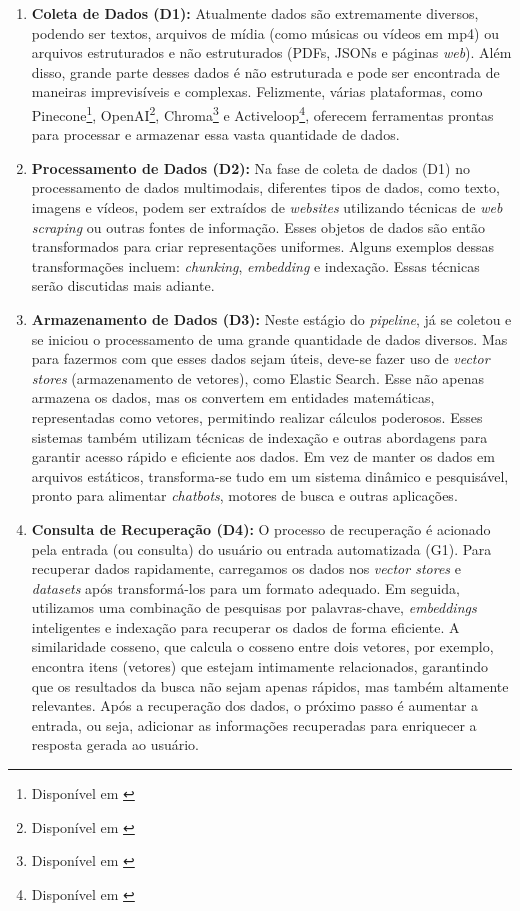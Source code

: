 \documentclass[a4paper, 12pt]{article}
\newcommand{\citeb}[1]{\bibleftbracket\cite{#1}\bibrightbracket}
\begin{document}
    \begin{enumerate}
        \item \textbf{Coleta de Dados (D1):} Atualmente dados são extremamente diversos, podendo ser textos, arquivos de mídia (como músicas ou vídeos em mp4) ou arquivos estruturados e não estruturados (PDFs, JSONs e páginas \textit{web}). Além disso, grande parte desses dados é não estruturada e pode ser encontrada de maneiras imprevisíveis e complexas. Felizmente, várias plataformas, como Pinecone\footnote{Disponível em \citeb{pinecone}}, OpenAI\footnote{Disponível em \citeb{openai}}, Chroma\footnote{Disponível em \citeb{chroma}} e Activeloop\footnote{Disponível em \citeb{activeloop}}, oferecem ferramentas prontas para processar e armazenar essa vasta quantidade de dados.
        \item \textbf{Processamento de Dados (D2):} Na fase de coleta de dados (D1) no processamento de dados multimodais, diferentes tipos de dados, como texto, imagens e vídeos, podem ser extraídos de \textit{websites} utilizando técnicas de \textit{web scraping} ou outras fontes de informação. Esses objetos de dados são então transformados para criar representações uniformes. Alguns exemplos dessas transformações incluem: \textit{chunking}, \textit{embedding} e indexação. Essas técnicas serão discutidas mais adiante.
        \item \textbf{Armazenamento de Dados (D3):} Neste estágio do \textit{pipeline}, já se coletou e se iniciou o processamento de uma grande quantidade de dados diversos. Mas para fazermos com que esses dados sejam úteis, deve-se fazer uso de \textit{vector stores} (armazenamento de vetores), como Elastic Search. Esse não apenas armazena os dados, mas os convertem em entidades matemáticas, representadas como vetores, permitindo realizar cálculos poderosos. Esses sistemas também utilizam técnicas de indexação e outras abordagens para garantir acesso rápido e eficiente aos dados. Em vez de manter os dados em arquivos estáticos, transforma-se tudo em um sistema dinâmico e pesquisável, pronto para alimentar \textit{chatbots}, motores de busca e outras aplicações.
        \item \textbf{Consulta de Recuperação (D4):} O processo de recuperação é acionado pela entrada (ou consulta) do usuário ou entrada automatizada (G1). Para recuperar dados rapidamente, carregamos os dados nos \textit{vector stores} e \textit{datasets} após transformá-los para um formato adequado. Em seguida, utilizamos uma combinação de pesquisas por palavras-chave, \textit{embeddings} inteligentes e indexação para recuperar os dados de forma eficiente.
        A similaridade cosseno, que calcula o cosseno entre dois vetores, por exemplo, encontra itens (vetores) que estejam intimamente relacionados, garantindo que os resultados da busca não sejam apenas rápidos, mas também altamente relevantes.
        Após a recuperação dos dados, o próximo passo é aumentar a entrada, ou seja, adicionar as informações recuperadas para enriquecer a resposta gerada ao usuário.
    \end{enumerate}
\end{document}
